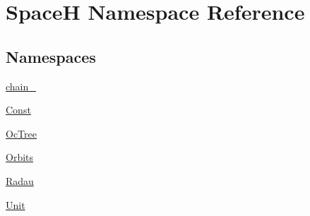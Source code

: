 \hypertarget{namespace_space_h}{}\section{SpaceH Namespace Reference}
\label{namespace_space_h}
\subsection*{Namespaces}
\begin{DoxyCompactItemize}
\item 
 \mbox{\hyperlink{namespace_space_h_1_1chain}{chain_}}
\item 
 \mbox{\hyperlink{namespace_space_h_1_1_const}{Const}}
\item 
 \mbox{\hyperlink{namespace_space_h_1_1_oc_tree}{Oc\+Tree}}
\item 
 \mbox{\hyperlink{namespace_space_h_1_1_orbits}{Orbits}}
\item 
 \mbox{\hyperlink{namespace_space_h_1_1_radau}{Radau}}
\item 
 \mbox{\hyperlink{namespace_space_h_1_1_unit}{Unit}}
\end{DoxyCompactItemize}
